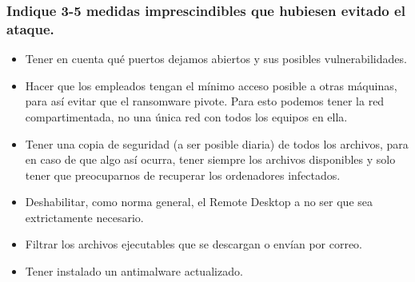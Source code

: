 \documentclass[12pt,twoside]{article}
\begin{document}
\subsubsection*{Indique 3-5 medidas imprescindibles que hubiesen evitado el ataque.}
\begin{itemize}
    \item Tener en cuenta qué puertos dejamos abiertos y sus posibles vulnerabilidades.
    \item Hacer que los empleados tengan el mínimo acceso posible a otras máquinas, para así evitar que el ransomware pivote. Para esto podemos tener la red compartimentada, no una única red con todos los equipos en ella.
    \item Tener una copia de seguridad (a ser posible diaria) de todos los archivos, para en caso de que algo así ocurra, tener siempre los archivos disponibles y solo tener que preocuparnos de recuperar los ordenadores infectados.
    \item Deshabilitar, como norma general, el Remote Desktop a no ser que sea extrictamente necesario.
    \item Filtrar los archivos ejecutables que se descargan o envían por correo.
    \item Tener instalado un antimalware actualizado.
\end{itemize}

\end{document}
